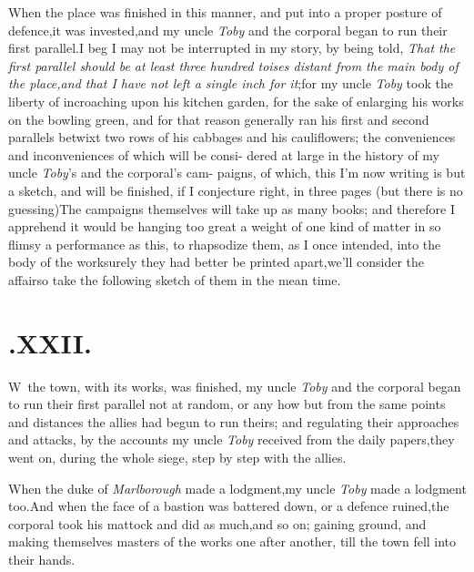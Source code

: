 \documentclass{article}
\begin{document}
When the place was finished in this 
manner, and put into a proper posture
of defence,\tsk it was invested,\tsk and my\break
uncle \textit{Toby} and the corporal began to run\break
their first parallel.\tsk I beg I may not\break
be interrupted in my story, by being\break
told, \textit{That the first parallel should be at least three
hundred toises distant from the main body of the place,\tsk and
that I have not left a single inch for it};\tsh for my
uncle \textit{Toby} took the liberty of incroaching upon his
kitchen garden, for the sake of enlarging his works on the
bowling green, and for that reason generally ran his first and
second parallels betwixt two rows of his cabbages and his
cauliflowers; the conveniences and inconveniences of which will be
consi- dered at large in the history of my\break
uncle \textit{Toby}’s and the corporal’s cam-\break
paigns, of which,
this I’m now writing is but a sketch, and will be finished,
if\break
I conjecture right, in three pages (but there is no
guessing)\tsh The campaigns themselves will take up as
many books; and therefore I apprehend it would be hanging too great
a weight of one kind of matter in so flimsy a performance as this,
to rhapsodize them, as I once intended, into the body of the
work\tsh surely they had better be printed
apart,\break\tsh we’ll consider the affair\tsh so
take the following sketch of them in the mean time.

\enlargethispage\baselineskip

\section{.\enspace XXII.}

\lettrine{W}{\,} the town, with its works,\break
was finished, my uncle \textit{Toby}\break
and the corporal began to run their first
parallel \tsh not at random, or any how\break
\tsh but from the same points and
distances the allies had begun to run theirs; and regulating
their approaches and attacks, by the accounts my uncle
\textit{Toby} received from the daily papers,\tsk they went on,
during the whole siege, step by step with the allies.

When the duke of \textit{Marlborough} made a
lodgment,\tsh my uncle \textit{Toby} made a lodgment
too.\tsh And when the face of a bastion was battered down,
or a defence ruined,\tsk the corporal took his mattock and did as
much,\tsk and so on;\break
\tsh gaining ground, and making
themselves masters of the works one after another, till the town
fell into their\break
hands.
\end{document}
